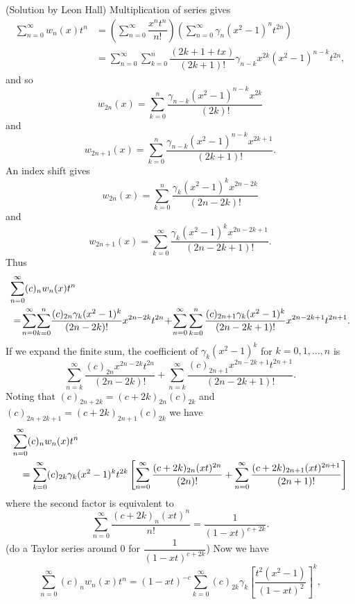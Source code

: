 \begin{solution}(Solution by Leon Hall)
Multiplication of series gives
$$\begin{array}{ll}
\displaystyle\sum_{n=0}^{\infty} w_n(x)t^n &= \left( \displaystyle\sum_{n=0}^{\infty} \dfrac{x^n t^n}{n!} \right) \left( \displaystyle\sum_{n=0}^{\infty} \gamma_n (x^2-1)^n t^{2n} \right) \\
&= \displaystyle\sum_{n=0}^{\infty} \displaystyle\sum_{k=0}^n \dfrac{(2k+1+tx)}{(2k+1)!} \gamma_{n-k} x^{2k} (x^2-1)^{n-k} t^{2n},
\end{array}$$
and so
$$w_{2n}(x) = \displaystyle\sum_{k=0}^n \dfrac{\gamma_{n-k}(x^2-1)^{n-k} x^{2k}}{(2k)!}$$
and
$$w_{2n+1}(x) = \displaystyle\sum_{k=0}^n \dfrac{\gamma_{n-k}(x^2-1)^{n-k}x^{2k+1}}{(2k+1)!}.$$
An index shift gives
$$w_{2n}(x) = \displaystyle\sum_{k=0}^n \dfrac{\gamma_k (x^2-1)^k x^{2n-2k}}{(2n-2k)!}$$
and
$$w_{2n+1}(x) = \displaystyle\sum_{k=0}^{\infty} \dfrac{\gamma_k (x^2-1)^k x^{2n-2k+1}}{(2n-2k+1)!}.$$
Thus
\begin{eqnarray*}
\lefteqn{\displaystyle\sum_{n=0}^{\infty} (c)_n w_n(x) t^n} \\
& &\!\!\!\!=\! \displaystyle\sum_{n=0}^{\infty}\! \sum_{k=0}^n\! \dfrac{(c)_{2n}\gamma_k (x^2-1)^k}{(2n-2k)!} x^{2n-2k}t^{2n}\! +\! \displaystyle\sum_{n=0}^{\infty} \sum_{k=0}^n \dfrac{(c)_{2n+1}\gamma_k (x^2-1)^k}{(2n-2k+1)!} x^{2n-2k+1} t^{2n+1}.
\end{eqnarray*}
If we expand the finite sum, the coefficient of $\gamma_k (x^2-1)^k$ for $k=0,1,\ldots,n$ is
$$\displaystyle\sum_{n=k}^{\infty} \dfrac{(c)_{2n} x^{2n-2k}t^{2n}}{(2n-2k)!} + \displaystyle\sum_{n=k}^{\infty} \dfrac{(c)_{2n+1} x^{2n-2k+1}t^{2n+1}}{(2n-2k+1)!}.$$
Noting that $(c)_{2n+2k} = (c+2k)_{2n}(c)_{2k}$ and $(c)_{2n+2k+1} = (c+2k)_{2n+1}(c)_{2k}$ we have
\begin{eqnarray*}
\lefteqn{\displaystyle\sum_{n=0}^{\infty} (c)_n w_n(x) t^n} \\
&& = \displaystyle\sum_{k=0}^{\infty} (c)_{2k}\gamma_k (x^2-1)^k t^{2k} \left[ \displaystyle\sum_{n=0}^{\infty} \dfrac{(c+2k)_{2n}(xt)^{2n}}{(2n)!} + \displaystyle\sum_{n=0}^{\infty} \dfrac{(c+2k)_{2n+1} (xt)^{2n+1}}{(2n+1)!} \right]
\end{eqnarray*}
where the second factor is equivalent to 
$$\displaystyle\sum_{n=0}^{\infty} \dfrac{(c+2k)_n (xt)^n}{n!} = \dfrac{1}{(1-xt)^{c+2k}}.$$
(do a Taylor series around $0$ for $\dfrac{1}{(1-xt)^{c+2k}}$)
Now we have
$$\displaystyle\sum_{n=0}^{\infty} (c)_nw_n(x)t^n = (1-xt)^{-c} \displaystyle\sum_{k=0}^{\infty} (c)_{2k} \gamma_k \left[ \dfrac{t^2(x^2-1)}{(1-xt)^2} \right]^k,$$

\end{solution}
